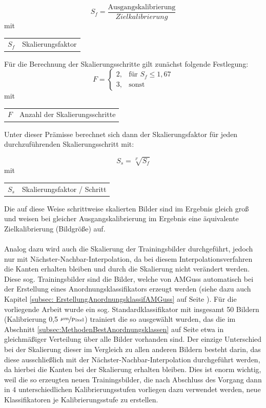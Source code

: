 \documentclass[
fontsize=10pt, 
listof = totoc,
parskip = half	
]{report}
\makeatletter
\newenvironment{conditions}
{\par\vspace{\abovedisplayskip}\noindent\begin{tabular}{>{$}l<{$} @{${}:{}$} l}}
	{\end{tabular}\par\vspace{\belowdisplayskip}}
\makeatother
\begin{document}
\begin{equation}
	S_f = \frac{\text{Ausgangskalibrierung}}{Zielkalibrierung}
\end{equation}
mit
\begin{conditions}
	S_f & Skalierungsfaktor
\end{conditions}

\noindent Für die Berechnung der Skalierungsschritte gilt zunächst folgende Festlegung:
\begin{equation}
	F = 
	\begin{cases}
		 2,		&	\text{für } S_f \leq 1,67\\
		 3, 	&	\text{sonst}
	\end{cases}
\end{equation}
mit
\begin{conditions}
	F & Anzahl der Skalierungsschritte
\end{conditions}

Unter dieser Prämisse berechnet sich dann der Skalierungsfaktor für jeden durchzuführenden Skalierungsschritt mit:

\begin{equation}
	S_s = \sqrt[F]{S_f}
\end{equation}
mit
\begin{conditions}
	S_{s} & Skalierungsfaktor / Schritt
\end{conditions}

\noindent Die auf diese Weise schrittweise skalierten Bilder sind im Ergebnis gleich groß und weisen bei gleicher Ausgangskalibrierung im Ergebnis eine äquivalente Zielkalibrierung (Bildgröße) auf.
\\\\
\noindent Analog dazu wird auch die Skalierung der Trainingsbilder durchgeführt, jedoch nur mit Nächster-Nachbar-Interpolation, da bei diesem Interpolationsverfahren die Kanten erhalten bleiben und durch die Skalierung nicht verändert werden. Diese sog. Trainingsbilder sind die Bilder, welche von AMGuss automatisch bei der Erstellung eines Anordnungsklassifikators erzeugt werden (siehe dazu auch Kapitel \ref{subsec: ErstellungAnordnungsklassifAMGuss} auf Seite \pageref{subsec: ErstellungAnordnungsklassifAMGuss}). Für die vorliegende Arbeit wurde ein sog. Standardklassifikator mit insgesamt 50 Bildern (Kalibrierung 0,5 $\nicefrac{\mu m}{\text{Pixel}}$) trainiert die so ausgewählt wurden, das die im Abschnitt \ref{subsec:MethodenBestAnordnungsklassen} auf Seite \pageref{subsec:MethodenBestAnordnungsklassen} etwa in gleichmäßiger Verteilung über alle Bilder vorhanden sind. Der einzige Unterschied bei der Skalierung dieser im Vergleich zu allen anderen Bildern besteht darin, das diese ausschließlich mit der Nächster-Nachbar-Interpolation durchgeführt werden, da hierbei die Kanten bei der Skalierung erhalten bleiben. Dies ist enorm wichtig, weil die so erzeugten neuen Trainingsbilder, die nach Abschluss des Vorgang dann in 4 unterschiedlichen Kalibrierungsstufen vorliegen dazu verwendet werden, neue Klassifikatoren je Kalibrierungsstufe zu erstellen.
\end{document}
